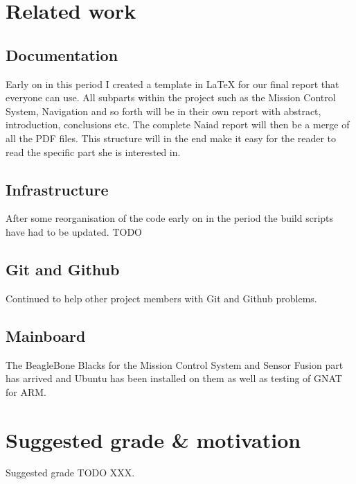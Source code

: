 
\section{Related work}
\subsection{Documentation}
Early on in this period I created a template in LaTeX for our final report that everyone can
use. All subparts within the project such as the Mission Control System,
Navigation and so forth will be in their own report with abstract, introduction,
conclusions etc. The complete Naiad report will then be a merge of all the PDF files.
This structure will in the end make it easy for the reader to read the
specific part she is interested in.

\subsection{Infrastructure}
After some reorganisation of the code early on in the period the build scripts
have had to be updated. TODO

\subsection{Git and Github}
Continued to help other project members with Git and Github problems.

\subsection{Mainboard}
The BeagleBone Blacks for the Mission Control System and Sensor Fusion part
has arrived and Ubuntu has been installed on them as well as testing of GNAT
for ARM.

\section{Suggested grade \& motivation}
Suggested grade TODO XXX.
